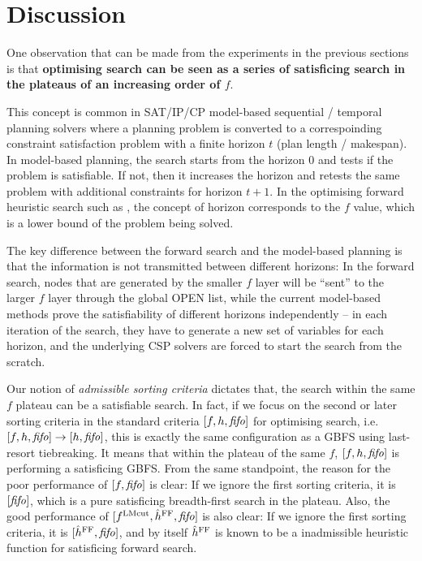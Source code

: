 \clearpage 
\section{Discussion}
\label{sec:discussion}

One observation that can be made from the experiments in the previous
sections is that \textbf{optimising search can be seen as a series of
satisficing search in the plateaus of an increasing order of $f$}.

This concept is common in SAT/IP/CP model-based sequential / temporal planning
solvers where a planning problem is converted to a correspoinding
constraint satisfaction problem with a finite horizon $t$ (plan length /
makespan). In model-based planning, the search starts from the horizon 0 and
tests if the problem is satisfiable. If not, then it increases the
horizon and retests the same problem with additional constraints for
horizon $t+1$. In the optimising forward
heuristic search such as \astar, the concept of horizon
corresponds to the $f$ value, which is a lower bound of the problem
being solved.

The key difference between the forward search and the model-based planning is
that the information is not transmitted between different horizons:
In the forward search, nodes that are generated by the smaller
$f$ layer will be ``sent'' to the larger $f$ layer through the global OPEN
list, while the current model-based methods prove the satisfiability of
different horizons independently -- in each iteration of the search,
they have to generate a new set of variables for each horizon, and the
underlying CSP solvers are forced to start the search from the scratch.

Our notion of \emph{admissible sorting criteria} dictates that, the
search within the same $f$ plateau can be a satisfiable search. In fact,
if we focus on the second or later sorting criteria in the standard criteria
$[f,h,{\text{\textit{fifo}}}]$ for optimising search, i.e. $[f,h,{\text{\textit{fifo}}}] \rightarrow [h,{\text{\textit{fifo}}}]$, this is exactly
the same configuration as a GBFS using \fifo last-resort tiebreaking. It
means that within the plateau of the same $f$, $[f,h,{\text{\textit{fifo}}}]$ is
performing a satisficing GBFS.
From the same standpoint, the reason for the poor performance of $[f,{\text{\textit{fifo}}}]$
is clear: If we ignore the first sorting criteria, it is $[{\text{\textit{fifo}}}]$,
which is a pure satisficing breadth-first search in the plateau.
Also, the good performance of $[f^{\text{LMcut}},\hat{h}^{\text{FF}},{\text{\textit{fifo}}}]$ is also clear:
If we ignore the first sorting criteria, it is $[\hat{h}^{\text{FF}},{\text{\textit{fifo}}}]$,
and by itself $\hat{h}^{\text{FF}}$ is known to be a \sota inadmissible heuristic
function for satisficing forward search.

